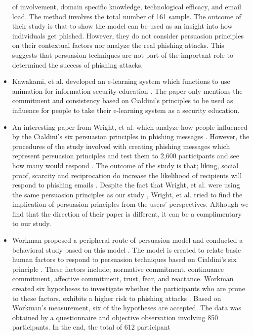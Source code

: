 \begin{itemize}
of involvement, domain specific knowledge, technological efficacy,
and email load. The method involves the total number of 161 sample.
The outcome of their study is that to show the model can be used as
an insight into how individuals get phished. However, they do not
consider persuasion principles on their contextual factors nor analyze
the real phishing attacks. This suggests that persuasion techniques
are not part of the important role to determined the success of phishing
attacks.
\item Kawakami, et al. developed an e-learning system which functions to
use animation for information security education \citep{kawakami2010development}.
The paper only mentions the commitment and consistency based on Cialdini's
principles to be used as influence for people to take their e-learning
system as a security education.
\item An interesting paper from Wright, et al. which analyze how people
influenced by the Cialdini's six persuasion principles in phishing
messages \citep{wright2014research}\citep{cialdini:2001}. However,
the procedures of the study involved with creating phishing messages
which represent persuasion principles and test them to 2,600 participants
and see how many would respond \citep{wright2014research}. The outcome
of the study is that; liking, social proof, scarcity and reciprocation
do increase the likelihood of recipients will respond to phishing
emails \citep{wright2014research}. Despite the fact that Wright,
et al. were using the same persuasion principles as our study \citep{cialdini:2001},
Wright, et al. tried to find the implication of persuasion principles
from the users' perspectives. Although we find that the direction
of their paper is different, it can be a complimentary to our study.
\item Workman proposed a peripheral route of persuasion model and conducted
a behavioral study based on this model \citep{workman:2008}. The
model is created to relate basic human factors to respond to persuasion
techniques based on Cialdini\textquoteright s six principle \citep{cialdini:2001}.
These factors include; normative commitment, continuance commitment,
affective commitment, trust, fear, and reactance. Workman created
six hypotheses to investigate whether the participants who are prone
to these factors, exhibits a higher risk to phishing attacks \citep{workman:2008}.
Based on Workman's measurement, six of the hypotheses are accepted.
The data was obtained by a questionnaire and objective observation
involving 850 participants. In the end, the total of 612 participant

\end{itemize}
